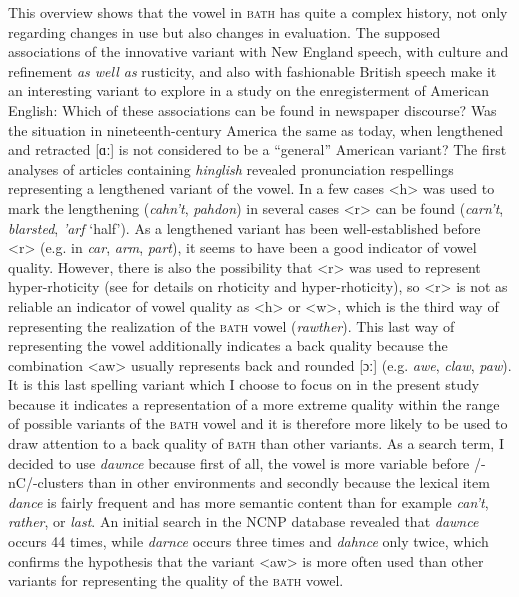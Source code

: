 This overview shows that the vowel in \textsc{bath} has quite a complex history, not only regarding changes in use but also changes in evaluation. The supposed associations of the innovative variant with New England speech, with culture and refinement \emph{as well as} rusticity, and also with fashionable British speech make it an interesting variant to explore in a study on the enregisterment of American English: Which of these associations can be found in newspaper discourse? Was the situation in nineteenth-century America the same as today, when lengthened and retracted [ɑː] is not considered to be a “general” American variant? The first analyses of articles containing \emph{hinglish} revealed pronunciation respellings representing a lengthened variant of the vowel. In a few cases <h> was used to mark the lengthening (\emph{cahn’t}, \emph{pahdon}) in several cases <r> can be found (\emph{carn’t}, \emph{blarsted}, \emph{’arf} ‘half’). As a lengthened variant has been well-established before <r> (e.g. in \emph{car}, \emph{arm}, \emph{part}), it seems to have been a good indicator of vowel quality. However, there is also the possibility that <r> was used to represent hyper-rhoticity (see  for details on rhoticity and hyper-rhoticity), so <r> is not as reliable an indicator of vowel quality as <h> or <w>, which is the third way of representing the realization of the \textsc{bath} vowel (\emph{rawther}). This last way of representing the vowel additionally indicates a back quality because the combination <aw> usually represents back and rounded [ɔː] (e.g. \emph{awe}, \emph{claw}, \emph{paw}). It is this last spelling variant which I choose to focus on in the present study because it indicates a representation of a more extreme quality within the range of possible variants of the \textsc{bath} vowel and it is therefore more likely to be used to draw attention to a back quality of \textsc{bath} than other variants. As a search term, I decided to use \emph{dawnce} because first of all, the vowel is more variable before /-nC/-clusters than in other environments and secondly because the lexical item \emph{dance} is fairly frequent and has more semantic content than for example \emph{can’t}, \emph{rather}, or \emph{last}. An initial search in the NCNP database revealed that \emph{dawnce} occurs 44 times, while \emph{darnce} occurs three times and \emph{dahnce} only twice, which confirms the hypothesis that the variant <aw> is more often used than other variants for representing the quality of the \textsc{bath} vowel.

